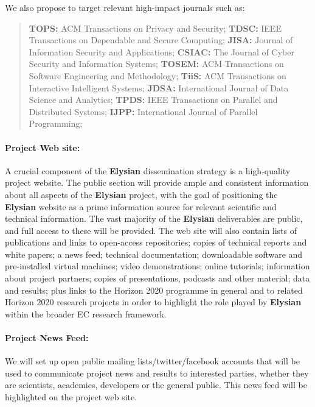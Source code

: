 \documentclass[a4paper,11pt]{article}
\newcommand{\project}[1]{\textbf{#1}\xspace}
\newcommand{\SECURITY}{\project{Elysian}}
\newcommand{\TheProject}{\SECURITY}
\begin{document}
\noindent
We also propose to target relevant high-impact journals such as:
\begin{quote}
\textbf{TOPS:} ACM Transactions on Privacy and Security;
\textbf{TDSC:} IEEE Transactions on Dependable and Secure Computing;
\textbf{JISA:} Journal of Information Security and Applications;
\textbf{CSIAC:} The Journal of Cyber Security and Information Systems;
\textbf{TOSEM:} ACM Transactions on Software Engineering and Methodology;
\textbf{TiiS:} ACM Transactions on Interactive Intelligent Systems;
\textbf{JDSA:} International Journal of Data Science and Analytics;
\textbf{TPDS:} IEEE Transactions on Parallel and Distributed Systems;
\textbf{IJPP:} International Journal of Parallel Programming;
\end{quote}

\paragraph{Project Web site:}  
A crucial component of the \TheProject{} dissemination strategy is a
high-quality project website. The public section will provide ample
and consistent information about all aspects of the \TheProject{}
project, with the goal of positioning the \TheProject{} website as a
prime information source for relevant scientific and technical
information.  The vast majority of the \TheProject{} deliverables are
public, and full access to these will be provided.  The web site will also contain lists of publications and links
to open-access repositories; copies of technical reports and white
papers; a news feed; technical documentation; downloadable software
and pre-installed virtual machines; video demonstrations; online
tutorials; information about project partners; copies of
presentations, podcasts and other material; data and results; plus
links to the Horizon 2020 programme in general and to related 
Horizon 2020 research projects in order to highlight the role played by \TheProject{} within the
broader EC research framework.

\paragraph{Project News Feed:}  We will set up open public mailing lists/twitter/facebook accounts that will
be used to communicate project news and results to interested parties, whether they are scientists, academics, developers
or the general public.  This news feed will be highlighted on the project web site.
\end{document}
